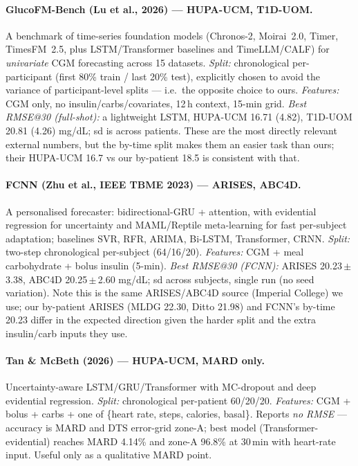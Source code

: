 \documentclass[10pt,letterpaper]{article}
\begin{document}
\paragraph{GlucoFM-Bench (Lu et al., 2026) --- HUPA-UCM, T1D-UOM.} A benchmark of
time-series foundation models (Chronos-2, Moirai~2.0, Timer, TimesFM~2.5, plus
LSTM/Transformer baselines and TimeLLM/CALF) for \emph{univariate} CGM
forecasting across 15 datasets. \emph{Split:} chronological per-participant
(first 80\% train / last 20\% test), explicitly chosen to avoid the variance of
participant-level splits --- i.e.\ the opposite choice to ours. \emph{Features:}
CGM only, no insulin/carbs/covariates, 12\,h context, 15-min grid.
\emph{Best RMSE@30 (full-shot):} a lightweight LSTM, HUPA-UCM 16.71 (4.82),
T1D-UOM 20.81 (4.26) mg/dL; sd is across patients. These are the most directly
relevant external numbers, but the by-time split makes them an easier task than
ours; their HUPA-UCM 16.7 vs our by-patient 18.5 is consistent with that.

\paragraph{FCNN (Zhu et al., IEEE TBME 2023) --- ARISES, ABC4D.} A personalised
forecaster: bidirectional-GRU + attention, with evidential regression for
uncertainty and MAML/Reptile meta-learning for fast per-subject adaptation;
baselines SVR, RFR, ARIMA, Bi-LSTM, Transformer, CRNN. \emph{Split:} two-step
chronological per-subject (64/16/20). \emph{Features:} CGM + meal carbohydrate +
bolus insulin (5-min). \emph{Best RMSE@30 (FCNN):} ARISES 20.23\,$\pm$\,3.38,
ABC4D 20.25\,$\pm$\,2.60 mg/dL; sd across subjects, single run (no seed
variation). Note this is the same ARISES/ABC4D source (Imperial College) we use;
our by-patient ARISES (MLDG 22.30, Ditto 21.98) and FCNN's by-time 20.23 differ
in the expected direction given the harder split and the extra insulin/carb
inputs they use.

\paragraph{Tan \& McBeth (2026) --- HUPA-UCM, MARD only.} Uncertainty-aware
LSTM/GRU/Transformer with MC-dropout and deep evidential regression. \emph{Split:}
chronological per-patient 60/20/20. \emph{Features:} CGM + bolus + carbs + one of
\{heart rate, steps, calories, basal\}. Reports \emph{no RMSE} --- accuracy is
MARD and DTS error-grid zone-A; best model (Transformer-evidential) reaches MARD
4.14\% and zone-A 96.8\% at 30\,min with heart-rate input. Useful only as a
qualitative MARD point.
\end{document}
